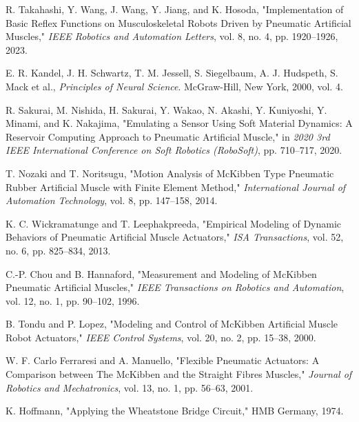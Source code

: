 \documentclass[letterpaper, 10 pt, conference]{IEEEconf}
\begin{document}
\begin{thebibliography}{99}
     R. Takahashi, Y. Wang, J. Wang, Y. Jiang, and K. Hosoda, "Implementation of Basic Reflex Functions on Musculoskeletal Robots Driven by Pneumatic Artificial Muscles," \textit{IEEE Robotics and Automation Letters}, vol. 8, no. 4, pp. 1920--1926, 2023.
    
     E. R. Kandel, J. H. Schwartz, T. M. Jessell, S. Siegelbaum, A. J. Hudspeth, S. Mack et al., \textit{Principles of Neural Science}. McGraw-Hill, New York, 2000, vol. 4.
    
     R. Sakurai, M. Nishida, H. Sakurai, Y. Wakao, N. Akashi, Y. Kuniyoshi, Y. Minami, and K. Nakajima, "Emulating a Sensor Using Soft Material Dynamics: A Reservoir Computing Approach to Pneumatic Artificial Muscle," in \textit{2020 3rd IEEE International Conference on Soft Robotics (RoboSoft)}, pp. 710--717, 2020.
    
     T. Nozaki and T. Noritsugu, "Motion Analysis of McKibben Type Pneumatic Rubber Artificial Muscle with Finite Element Method," \textit{International Journal of Automation Technology}, vol. 8, pp. 147--158, 2014.
    
     K. C. Wickramatunge and T. Leephakpreeda, "Empirical Modeling of Dynamic Behaviors of Pneumatic Artificial Muscle Actuators," \textit{ISA Transactions}, vol. 52, no. 6, pp. 825--834, 2013.
    
     C.-P. Chou and B. Hannaford, "Measurement and Modeling of McKibben Pneumatic Artificial Muscles," \textit{IEEE Transactions on Robotics and Automation}, vol. 12, no. 1, pp. 90--102, 1996.
    
     B. Tondu and P. Lopez, "Modeling and Control of McKibben Artificial Muscle Robot Actuators," \textit{IEEE Control Systems}, vol. 20, no. 2, pp. 15--38, 2000.
    
     W. F. Carlo Ferraresi and A. Manuello, "Flexible Pneumatic Actuators: A Comparison between The McKibben and the Straight Fibres Muscles," \textit{Journal of Robotics and Mechatronics}, vol. 13, no. 1, pp. 56--63, 2001.

     K. Hoffmann, "Applying the Wheatstone Bridge Circuit," HMB Germany, 1974.
    
    \end{thebibliography}
    

    
\end{document}
